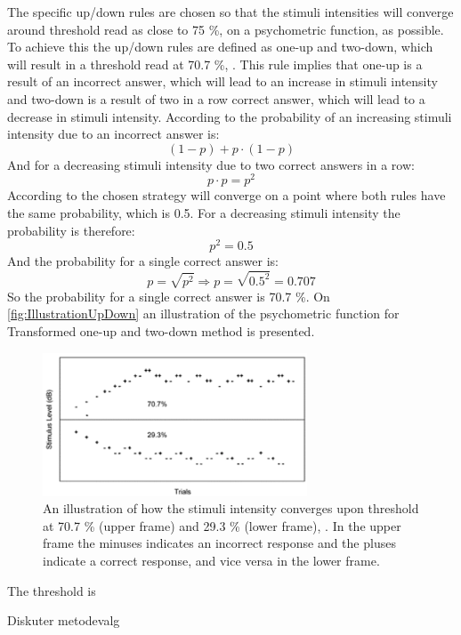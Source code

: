 The specific up/down rules are chosen so that the stimuli intensities will converge around threshold read as close to 75 \%, on a psychometric function, as possible. To achieve this the up/down rules are defined as one-up and two-down, which will result in a threshold read at 70.7 \%, \parencite[p. 22]{PDF:Psychoacoustic}. This rule implies that one-up is a result of an incorrect answer, which will lead to an increase in stimuli intensity and two-down is a result of two in a row correct answer, which will lead to a decrease in stimuli intensity. According to \textcite[p. 293]{PDF:Hearing} the probability of an increasing stimuli intensity due to an incorrect answer is: 
%
\begin{equation}
	(1-p)+p\cdot(1-p)
\end{equation}  
%
And for a decreasing stimuli intensity due to two correct answers in a row: 
%
\begin{equation}
	p\cdot p = p^2
\end{equation}    
%       
According to \textcite[p. 293]{PDF:Hearing} the chosen strategy will converge on a point where both rules have the same probability, which is 0.5. For a decreasing stimuli intensity the probability is therefore:
%
\begin{equation}
	p^2=0.5
\end{equation}  
%
And the probability for a single correct answer is: 
%
\begin{equation}
	p = \sqrt{p^2} \Rightarrow p = \sqrt{0.5^2} = 0.707
\end{equation}
%
So the probability for a single correct answer is 70.7 \%. On \autoref{fig:IllustrationUpDown} an illustration of the psychometric function for Transformed one-up and two-down method is presented. 
%
\begin{figure}[H]
	\centering
	\includegraphics[resolution=300,width=0.7\textwidth]{Figure/IllustrationOfUpDown}
	\caption{An illustration of how the stimuli intensity converges upon threshold at 70.7 \% (upper frame) and 29.3 \% (lower frame), \parencite[p. 294]{PDF:Hearing}. In the upper frame the minuses indicates an incorrect response and the pluses indicate a correct response, and vice versa in the lower frame.}
	\label{fig:IllustrationUpDown}
\end{figure}
\noindent
%
The threshold is 





Diskuter metodevalg